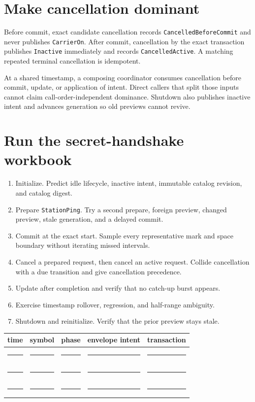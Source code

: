 \documentclass[10pt]{article}
\newcommand{\blankline}{\rule{0.78in}{0.4pt}}
\begin{document}
\section{Make cancellation dominant}
Before commit, exact candidate cancellation records
\texttt{CancelledBeforeCommit} and never publishes \texttt{CarrierOn}. After
commit, cancellation by the exact transaction publishes \texttt{Inactive}
immediately and records \texttt{CancelledActive}. A matching repeated terminal
cancellation is idempotent.

At a shared timestamp, a composing coordinator consumes cancellation before
commit, update, or application of intent. Direct callers that split those
inputs cannot claim call-order-independent dominance. Shutdown also publishes
inactive intent and advances generation so old previews cannot revive.

\newpage
\section{Run the secret-handshake workbook}
\begin{enumerate}
 \item Initialize. Predict idle lifecycle, inactive intent, immutable catalog
       revision, and catalog digest.
 \item Prepare \texttt{StationPing}. Try a second prepare, foreign preview,
       changed preview, stale generation, and a delayed commit.
 \item Commit at the exact start. Sample every representative mark and space
       boundary without iterating missed intervals.
 \item Cancel a prepared request, then cancel an active request. Collide
       cancellation with a due transition and give cancellation precedence.
 \item Update after completion and verify that no catch-up burst appears.
 \item Exercise timestamp rollover, regression, and half-range ambiguity.
 \item Shutdown and reinitialize. Verify that the prior preview stays stale.
\end{enumerate}

\begin{tabularx}{\linewidth}{@{}X X X X X@{}}
\toprule
time & symbol & phase & envelope intent & transaction\\
\midrule
\rule{0pt}{16pt}\blankline & \blankline & \blankline & \blankline & \blankline\\[8pt]
\blankline & \blankline & \blankline & \blankline & \blankline\\[8pt]
\blankline & \blankline & \blankline & \blankline & \blankline\\
\bottomrule
\end{tabularx}
\end{document}
